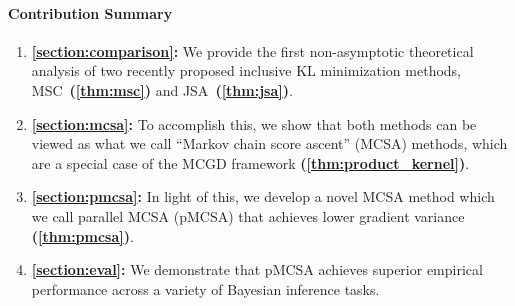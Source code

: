 \vspace{-0.1in}
\paragraph{Contribution Summary}
\setlength\itemsep{0.01in}
\begin{enumerate}[leftmargin=7mm,listparindent=\parindent]
    \item \textbf{\cref{section:comparison}:} We provide the first non-asymptotic theoretical analysis of two recently proposed inclusive KL minimization methods, MSC~\textbf{(\cref{thm:msc})} and JSA~\textbf{(\cref{thm:jsa})}.
    \item \textbf{\cref{section:mcsa}:} To accomplish this, we show that both methods can be viewed as what we call ``Markov chain score ascent'' (MCSA) methods, which are a special case of the MCGD framework \textbf{(\cref{thm:product_kernel})}.
    \item \textbf{\cref{section:pmcsa}:} In light of this, we develop a novel MCSA method which we call parallel MCSA (pMCSA) that achieves lower gradient variance \textbf{(\cref{thm:pmcsa})}.
    \item \textbf{\cref{section:eval}:} We demonstrate that pMCSA achieves superior empirical performance across a variety of Bayesian inference tasks.
\end{enumerate}

